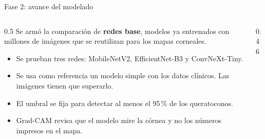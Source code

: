 \begin{frame}{Fase 2: avance del modelado}
    \begin{columns}[T]
        \begin{column}{0.5\textwidth}
            \small
            Se armó la comparación de \textbf{redes base}, modelos ya entrenados con millones de imágenes que se reutilizan para los mapas corneales.
            \begin{itemize}
                \item Se prueban tres redes: MobileNetV2, EfficientNet-B3 y ConvNeXt-Tiny.
                \item Se usa como referencia un modelo simple con los datos clínicos. Las imágenes tienen que superarlo.
                \item El umbral se fija para detectar al menos el 95\,\% de los queratoconos.
                \item Grad-CAM revisa que el modelo mire la córnea y no los números impresos en el mapa.
            \end{itemize}
        \end{column}
        \begin{column}{0.46\textwidth}
            \centering
        \end{column}
    \end{columns}
\end{frame}

